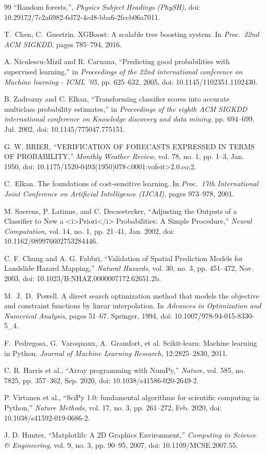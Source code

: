 \begin{thebibliography}{99}
``Random forests,'', \emph{Physics Subject Headings (PhySH)}, doi: 10.29172/7c2a6982-6d72-4cd8-bba6-2fccb06a7011.

T.~Chen, C.~Guestrin. XGBoost: A scalable tree boosting system. In \emph{Proc.\ 22nd ACM SIGKDD}, pages 785--794, 2016.

A. Niculescu-Mizil and R. Caruana, ``Predicting good probabilities with supervised learning,'' in \emph{Proceedings of the 22nd international conference on Machine learning - ICML '05}, pp. 625--632, 2005, doi: 10.1145/1102351.1102430.

B. Zadrozny and C. Elkan, ``Transforming classifier scores into accurate multiclass probability estimates,'' in \emph{Proceedings of the eighth ACM SIGKDD international conference on Knowledge discovery and data mining}, pp. 694--699, Jul. 2002, doi: 10.1145/775047.775151.

G. W. BRIER, ``VERIFICATION OF FORECASTS EXPRESSED IN TERMS OF PROBABILITY,'' \emph{Monthly Weather Review}, vol. 78, no. 1, pp. 1--3, Jan. 1950, doi: 10.1175/1520-0493(1950)078<0001:vofeit>2.0.co;2.

C.~Elkan. The foundations of cost-sensitive learning. In \emph{Proc.\ 17th International Joint Conference on Artificial Intelligence (IJCAI)}, pages 973--978, 2001.

M. Saerens, P. Latinne, and C. Decaestecker, ``Adjusting the Outputs of a Classifier to New a <i>Priori</i> Probabilities: A Simple Procedure,'' \emph{Neural Computation}, vol. 14, no. 1, pp. 21--41, Jan. 2002, doi: 10.1162/089976602753284446.

C. F. Chung and A. G. Fabbri, ``Validation of Spatial Prediction Models for Landslide Hazard Mapping,'' \emph{Natural Hazards}, vol. 30, no. 3, pp. 451--472, Nov. 2003, doi: 10.1023/B:NHAZ.0000007172.62651.2b.

M.~J.~D.~Powell. A direct search optimization method that models the objective and constraint functions by linear interpolation. In \emph{Advances in Optimization and Numerical Analysis}, pages 51--67. Springer, 1994, doi: 10.1007/978-94-015-8330-5\_4.

F.~Pedregosa, G.~Varoquaux, A.~Gramfort, et al. Scikit-learn: Machine learning in Python. \emph{Journal of Machine Learning Research}, 12:2825--2830, 2011.

C. R. Harris et al., ``Array programming with NumPy,'' \emph{Nature}, vol. 585, no. 7825, pp. 357--362, Sep. 2020, doi: 10.1038/s41586-020-2649-2.

P. Virtanen et al., ``SciPy 1.0: fundamental algorithms for scientific computing in Python,'' \emph{Nature Methods}, vol. 17, no. 3, pp. 261--272, Feb. 2020, doi: 10.1038/s41592-019-0686-2.

J. D. Hunter, ``Matplotlib: A 2D Graphics Environment,'' \emph{Computing in Science \& Engineering}, vol. 9, no. 3, pp. 90--95, 2007, doi: 10.1109/MCSE.2007.55.

\end{thebibliography}
